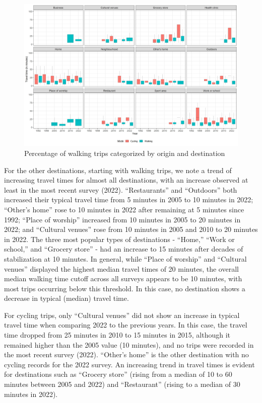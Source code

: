 \documentclass[preprint, 3p,
authoryear]{elsarticle} %
\begin{document}
\begin{figure}
\includegraphics[width=1\linewidth]{figures/destination_boxplots} \caption{Percentage of walking trips categorized by origin and destination}\label{fig:figure-boxplot}
\end{figure}

For the other destinations, starting with walking trips, we note a trend
of increasing travel times for almost all destinations, with an increase
observed at least in the most recent survey (2022). ``Restaurants'' and
``Outdoors'' both increased their typical travel time from 5 minutes in
2005 to 10 minutes in 2022; ``Other's home'' rose to 10 minutes in 2022
after remaining at 5 minutes since 1992; ``Place of worship'' increased
from 10 minutes in 2005 to 20 minutes in 2022; and ``Cultural venues''
rose from 10 minutes in 2005 and 2010 to 20 minutes in 2022. The three
most popular types of destinations - ``Home,'' ``Work or school,'' and
``Grocery store'' - had an increase to 15 minutes after decades of
stabilization at 10 minutes. In general, while ``Place of worship'' and
``Cultural venues'' displayed the highest median travel times of 20
minutes, the overall median walking time cutoff across all surveys
appears to be 10 minutes, with most trips occurring below this
threshold. In this case, no destination shows a decrease in typical
(median) travel time.

For cycling trips, only ``Cultural venues'' did not show an increase in
typical travel time when comparing 2022 to the previous years. In this
case, the travel time dropped from 25 minutes in 2010 to 15 minutes in
2015, although it remained higher than the 2005 value (10 minutes), and
no trips were recorded in the most recent survey (2022). ``Other's
home'' is the other destination with no cycling records for the 2022
survey. An increasing trend in travel times is evident for destinations
such as ``Grocery store'' (rising from a median of 10 to 60 minutes
between 2005 and 2022) and ``Restaurant'' (rising to a median of 30
minutes in 2022).
\end{document}
